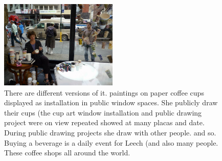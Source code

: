   \begin{figure}[h!]
      \centering
      \includegraphics[width=0.5\textwidth]{graphics/Gwyneth-Leech-cup3.jpg}
      \caption[Gwyneth Leech while painting in the public]{There are different versions of it. paintings on paper coffee cups displayed as installation in public window spaces. She publicly draw their cups (the cup art window installation and public drawing project were on view repeated showed at many placas and date. During public drawing projects she draw with other people. and so. Buying a beverage is a daily event for Leech (and also many people. These coffee shops all around the world.}
      \label{fig:GwynethLeech_InAction}
  \end{figure}


